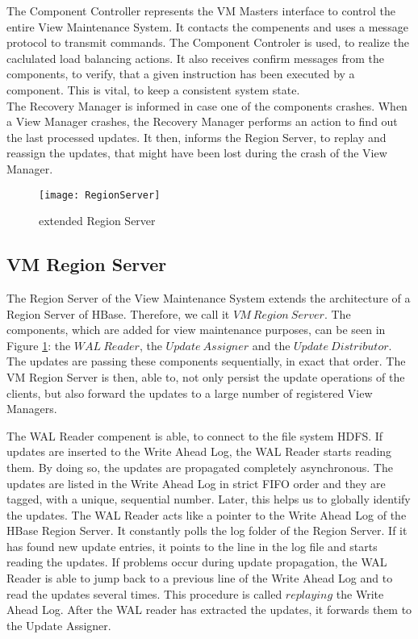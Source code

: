 \documentclass[11pt,a4paper,bibtotoc,idxtotoc,headsepline,footsepline,footexclude,BCOR12mm,DIV13]{scrbook}
\begin{document}
The Component Controller represents the VM Masters interface to control the entire View Maintenance System. It contacts the compenents and uses a message protocol to transmit commands. The Component Controler is used, to realize the caclulated load balancing actions. It also receives confirm messages from the components, to verify, that a given instruction has been executed by a component. This is vital, to keep a consistent system state.\\

The Recovery Manager is informed in case one of the components crashes. When a View Manager crashes, the Recovery Manager performs an action to find out the last processed updates. It then, informs the Region Server, to replay and reassign the updates, that might have been lost during the crash of the View Manager.



\begin{figure}[h!]
  
  \centering
    \texttt{[image: RegionServer]}
    \caption{extended Region Server}
    \label{fig:regionserver}
\end{figure}

\subsection{VM Region Server}
\label{subsec:vmregionserver}
The Region Server of the View Maintenance System extends the architecture of a Region Server of HBase. Therefore, we call it $VM\:Region\:Server$. The components, which are added for view maintenance purposes, can be seen in Figure \ref{fig:regionserver}: the $WAL\:Reader$, the $Update\:Assigner$ and the $Update\:Distributor$. The updates are passing these components sequentially, in exact that order.  The VM Region Server is then, able to, not only persist the update operations of the clients, but also forward the updates to a large number of registered View Managers. 
 
The WAL Reader compenent is able, to connect to the file system HDFS. If updates are inserted to the Write Ahead Log, the WAL Reader starts reading them. By doing so, the updates are propagated completely asynchronous. The updates are listed in the Write Ahead Log in strict FIFO order and they are tagged, with a unique, sequential number. Later, this helps us to globally identify the updates. The WAL Reader acts like a pointer to the Write Ahead Log of the HBase Region Server. It constantly polls the log folder of the Region Server. If it has found new update entries, it points to the line in the log file and starts reading the updates. If problems occur during update propagation, the WAL Reader is able to jump back to a previous line of the Write Ahead Log and to read the updates several times. This procedure is called $replaying$ the Write Ahead Log. After the WAL reader has extracted the updates, it forwards them to the Update Assigner.
\end{document}
